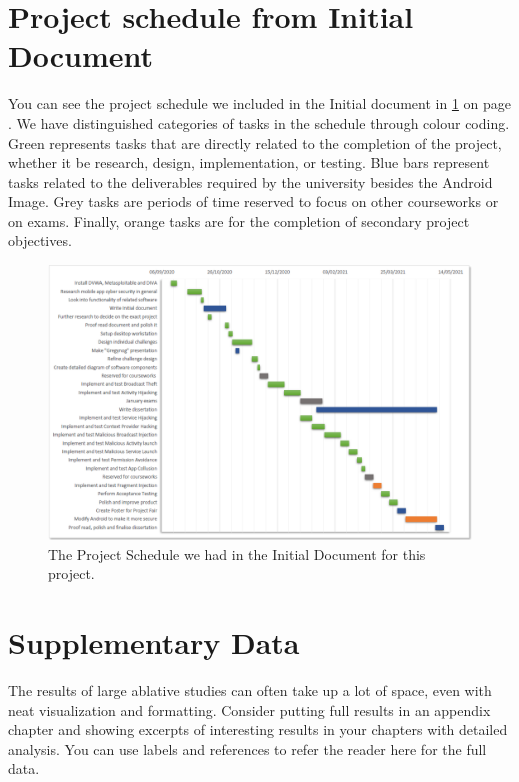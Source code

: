 
\chapter{Project schedule from Initial Document}
\label{app:project_schedule}

    You can see the project schedule we included in the Initial document in \ref{app:project_schedule} on page \pageref{app:project_schedule}. We have distinguished categories of tasks in the schedule through colour coding. Green represents tasks that are directly related to the completion of the project, whether it be research, design, implementation, or testing. Blue bars represent tasks related to the deliverables required by the university besides the Android Image. Grey tasks are periods of time reserved to focus on other courseworks or on exams. Finally, orange tasks are for the completion of secondary project objectives.
    
    \begin{landscape}
    \begin{figure}[H]
    	\centering
    	\includegraphics[width=1\linewidth]{./graphics/schedule.PNG}
    	
    	\caption[Project schedule.]{The Project Schedule we had in the Initial Document for this project.}
    	
    	\label{fig:schedule}
    \end{figure}
    \end{landscape}

\chapter{Supplementary Data}
\label{app:supplementary_data}

The results of large ablative studies can often take up a lot of space, even with neat visualization and formatting. Consider putting full results in an appendix chapter and showing excerpts of interesting results in your chapters with detailed analysis. You can use labels and references to refer the reader here for the full data.
